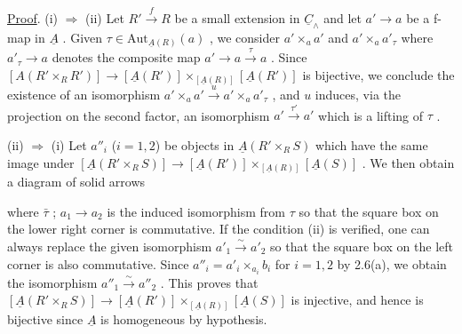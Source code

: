 \underline{Proof}.  (i) $\Rightarrow$ (ii)  Let  $R' \xrightarrow{\ f\ } R$  be a small extension in  $\underline{C}_{\wedge}$  and let  $a' \to a$  be a f-map in  $\underline{A}$ . Given  $\tau \in \mathrm{Aut}_{\underline{A}(R)}(a)$  , we consider  $a' \times_{a} a'$  and  $a' \times_{a} a'_{\tau}$  where  $a'_{\tau} \longrightarrow a$  denotes the composite map  $a' \longrightarrow a \xrightarrow{\ \tau\ } a$  . Since  $[A(R' \times_{R} R')] \longrightarrow [\underline{A}(R')] \times_{[\underline{A}(R)]} [\underline{A}(R')]$  is bijective, we conclude the existence of an isomorphism  $a' \times_{a} a' \xrightarrow{\ u\ } a' \times_{a} a'_{\tau}$  , and  $u$  induces, via the projection on the second factor, an isomorphism  $a' \xrightarrow{\ \tau'\ } a'$  which is a lifting of  $\tau$  .

(ii) $\Rightarrow$ (i)  Let  $a''_{i}$  ($i=1,2$)  be objects in  $\underline{A}(R' \times_{R} S)$  which have the same image under  $[\underline{A}(R' \times_{R} S)] \to [\underline{A}(R')] \times_{[\underline{A}(R)]} [\underline{A}(S)]$  . We then obtain a diagram of solid arrows

\begin{center}
\qquad {} \qquad
{}
\end{center}
where  $\bar{\tau}$ ; $a_{1} \to a_{2}$  is the induced isomorphism from  $\tau$  so that the square box on the lower right corner is commutative. If the condition (ii) is verified, one can always replace the given isomorphism  $a'_{1} \overset{\sim}{\to} a'_{2}$  so that the square box on the left corner is also commutative. Since  $a''_{i} = a'_{i} \times_{a_{i}} b_{i}$  for  $i = 1, 2$  by  2.6(a), we obtain the isomorphism  $a''_{1} \overset{\sim}{\to} a''_{2}$  . This proves that  $[\underline{A}(R' \times_{R} S)] \longrightarrow [\underline{A}(R')] \times_{[\underline{A}(R)]} [\underline{A}(S)]$  is injective, and hence is bijective since  $\underline{A}$  is homogeneous by hypothesis.

